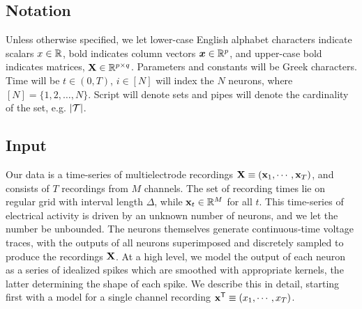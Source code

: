 \newcommand{\bY}{\mathbf{Y}}
\newcommand{\NN}{\mathbb{N}}         

\subsection{Notation}

Unless otherwise specified, we let lower-case English alphabet characters indicate scalars $x \in \mathbb{R}$, bold indicates column vectors $\boldsymbol{x} \in \mathbb{R}^p$, and upper-case bold indicates matrices, $\mathbf{X} \in \mathbb{R}^{p \times q}$.  Parameters and constants will be Greek characters.  Time will be $t \in (0,T)$, $i \in [N]$ will index the $N$ neurons, where $[N]=\{1,2,\ldots,N\}$. Script will denote sets and pipes will denote the cardinality of the set, e.g. $|\mathcal{T}|$.  
\vspace{-.1in}
\subsection{Input}
\vspace{-.1in}
Our data is a time-series of multielectrode recordings $\mathbf{X} \equiv (\mathbf{x}_1, \cdots, \mathbf{x}_T)$, and consists of $T$ recordings from $M$ channels. 
The set of recording times lie on regular grid with interval length $\Delta$, while $\mathbf{x}_t \in \mathbb{R}^M$ for all $t$. 
This time-series of electrical activity is driven by an unknown number of neurons, and 
we let the number be unbounded. %
The neurons themselves generate continuous-time voltage traces, with the outputs of all neurons superimposed and discretely sampled to produce the 
recordings $\mathbf{X}$.  At a high level, we model the output of each neuron as a
series of idealized spikes which are smoothed with appropriate kernels, the latter determining the shape of each spike. 
We describe this in detail, starting first with a model for a single channel recording $\mathbf{x}^{\mathsf{T}} \equiv (x_1, \cdots, x_T)$.

